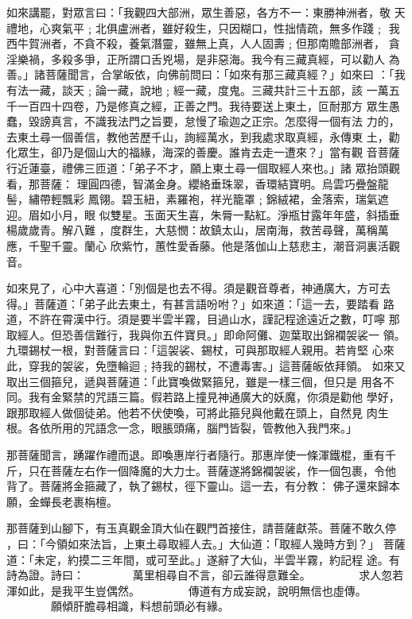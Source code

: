 \begin{pinyinscope}
{如來講罷，對眾言曰：「我觀四大部洲，眾生善惡，各方不一：東勝神洲者，敬
天禮地，心爽氣平﹔北俱盧洲者，雖好殺生，只因糊口，性拙情疏，無多作踐﹔
我西牛賀洲者，不貪不殺，養氣潛靈，雖無上真，人人固壽﹔但那南贍部洲者，
貪淫樂禍，多殺多爭，正所謂口舌兇場，是非惡海。我今有三藏真經，可以勸人
為善。」諸菩薩聞言，合掌皈依，向佛前問曰：「如來有那三藏真經？」如來曰
：「我有法一藏，談天﹔論一藏，說地﹔經一藏，度鬼。三藏共計三十五部，該
一萬五千一百四十四卷，乃是修真之經，正善之門。我待要送上東土，叵耐那方
眾生愚蠢，毀謗真言，不識我法門之旨要，怠慢了瑜迦之正宗。怎麼得一個有法
力的，去東土尋一個善信，教他苦歷千山，詢經萬水，到我處求取真經，永傳東
土，勸化眾生，卻乃是個山大的福緣，海深的善慶。誰肯去走一遭來？」當有觀
音菩薩行近蓮臺，禮佛三匝道：「弟子不才，願上東土尋一個取經人來也。」諸
眾抬頭觀看，那菩薩：
理圓四德，智滿金身。纓絡垂珠翠，香環結寶明。烏雲巧疊盤龍髻，繡帶輕飄彩
鳳翎。碧玉紐，素羅袍，祥光籠罩﹔錦絨裙，金落索，瑞氣遮迎。眉如小月，眼
似雙星。玉面天生喜，朱脣一點紅。淨瓶甘露年年盛，斜插垂楊歲歲青。解八難
，度群生，大慈憫：故鎮太山，居南海，救苦尋聲，萬稱萬應，千聖千靈。蘭心
欣紫竹，蕙性愛香藤。他是落伽山上慈悲主，潮音洞裏活觀音。

如來見了，心中大喜道：「別個是也去不得。須是觀音尊者，神通廣大，方可去
得。」菩薩道：「弟子此去東土，有甚言語吩咐？」如來道：「這一去，要踏看
路道，不許在霄漢中行。須是要半雲半霧，目過山水，謹記程途遠近之數，叮嚀
那取經人。但恐善信難行，我與你五件寶貝。」即命阿儺、迦葉取出錦襴袈裟一
領。九環錫杖一根，對菩薩言曰：「這袈裟、錫杖，可與那取經人親用。若肯堅
心來此，穿我的袈裟，免墮輪迴﹔持我的錫杖，不遭毒害。」這菩薩皈依拜領。
如來又取出三個箍兒，遞與菩薩道：「此寶喚做緊箍兒，雖是一樣三個，但只是
用各不同。我有金緊禁的咒語三篇。假若路上撞見神通廣大的妖魔，你須是勸他
學好，跟那取經人做個徒弟。他若不伏使喚，可將此箍兒與他戴在頭上，自然見
肉生根。各依所用的咒語念一念，眼脹頭痛，腦門皆裂，管教他入我門來。」

那菩薩聞言，踴躍作禮而退。即喚惠岸行者隨行。那惠岸使一條渾鐵棍，重有千
斤，只在菩薩左右作一個降魔的大力士。菩薩遂將錦襴袈裟，作一個包裹，令他
背了。菩薩將金箍藏了，執了錫杖，徑下靈山。這一去，有分教：
佛子還來歸本願，金蟬長老裹栴檀。

那菩薩到山腳下，有玉真觀金頂大仙在觀門首接住，請菩薩獻茶。菩薩不敢久停
，曰：「今領如來法旨，上東土尋取經人去。」大仙道：「取經人幾時方到？」
菩薩道：「未定，約摸二三年間，或可至此。」遂辭了大仙，半雲半霧，約記程
途。有詩為證。詩曰：
　　　　萬里相尋自不言，卻云誰得意難全。
　　　　求人忽若渾如此，是我平生豈偶然。
　　　　傳道有方成妄說，說明無信也虛傳。
　　　　願傾肝膽尋相識，料想前頭必有緣。

}
\end{pinyinscope}
